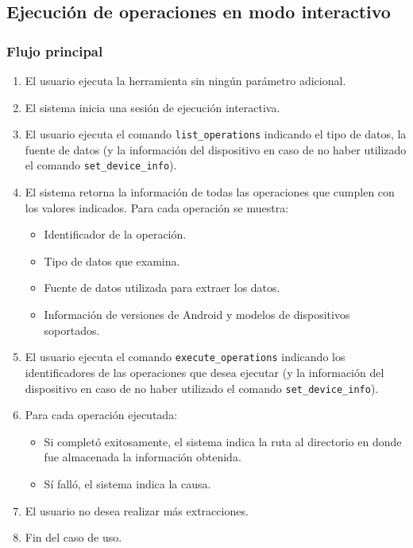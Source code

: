 \subsection{Ejecución de operaciones en modo interactivo}

\subsubsection*{Flujo principal}
\begin{enumerate}
\item El usuario ejecuta la herramienta sin ningún parámetro adicional.
\item El sistema inicia una sesión de ejecución interactiva.
\item El usuario ejecuta el comando \texttt{list\_operations} indicando el tipo de datos, la fuente de datos (y la información del dispositivo en caso de no haber utilizado el comando \texttt{set\_device\_info}).
\item El sistema retorna la información de todas las operaciones que cumplen con los valores indicados. Para cada operación se muestra:
    \begin{itemize}
    \item Identificador de la operación.
    \item Tipo de datos que examina.
    \item Fuente de datos utilizada para extraer los datos.
    \item Información de versiones de Android y modelos de dispositivos soportados.
    \end{itemize}
\item El usuario ejecuta el comando \texttt{execute\_operations} indicando los identificadores de las operaciones que desea ejecutar (y la información del dispositivo en caso de no haber utilizado el comando \texttt{set\_device\_info}).
\item Para cada operación ejecutada:
    \begin{itemize}
    \item Si completó exitosamente, el sistema indica la ruta al directorio en donde fue almacenada la información obtenida.
    \item Sí falló, el sistema indica la causa.
    \end{itemize}
\item El usuario no desea realizar más extracciones.
\item Fin del caso de uso.
\end{enumerate}

